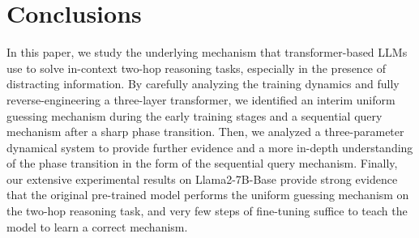 \section{Conclusions}
\label{sec:conclusion}

In this paper, we study the underlying mechanism that transformer-based LLMs use to solve in-context two-hop reasoning tasks, especially in the presence of distracting information. By carefully analyzing the training dynamics and fully reverse-engineering a three-layer transformer, we identified an interim uniform guessing mechanism during the early training stages and a sequential query mechanism after a sharp phase transition. Then, we analyzed a three-parameter dynamical system to provide further evidence and a more in-depth understanding of the phase transition in the form of the sequential query mechanism. Finally, our extensive experimental results on Llama2-7B-Base provide strong evidence that the original pre-trained model performs the uniform guessing mechanism on the two-hop reasoning task, and very few steps of fine-tuning suffice to teach the model to learn a correct mechanism.

